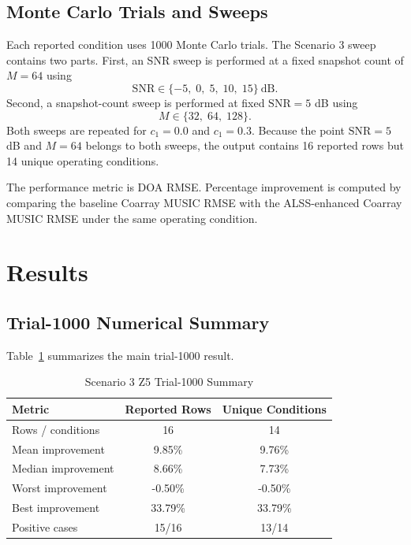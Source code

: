 \documentclass[conference]{IEEEtran}
\begin{document}
\subsection{Monte Carlo Trials and Sweeps}

Each reported condition uses 1000 Monte Carlo trials. The Scenario 3 sweep contains two parts. First, an SNR sweep is performed at a fixed snapshot count of $M=64$ using
\begin{equation}
    \mathrm{SNR} \in \{-5,\;0,\;5,\;10,\;15\}\ \mathrm{dB}.
\end{equation}
Second, a snapshot-count sweep is performed at fixed $\mathrm{SNR}=5$ dB using
\begin{equation}
    M \in \{32,\;64,\;128\}.
\end{equation}
Both sweeps are repeated for $c_1=0.0$ and $c_1=0.3$. Because the point $\mathrm{SNR}=5$ dB and $M=64$ belongs to both sweeps, the output contains 16 reported rows but 14 unique operating conditions.

The performance metric is DOA RMSE. Percentage improvement is computed by comparing the baseline Coarray MUSIC RMSE with the ALSS-enhanced Coarray MUSIC RMSE under the same operating condition.

\section{Results}

\subsection{Trial-1000 Numerical Summary}

Table~\ref{tab:trial1000_summary} summarizes the main trial-1000 result.

\begin{table}[!t]
\centering
\caption{Scenario 3 Z5 Trial-1000 Summary}
\label{tab:trial1000_summary}
\begin{tabular}{lcc}
\toprule
Metric & Reported Rows & Unique Conditions \\
\midrule
Rows / conditions & 16 & 14 \\
Mean improvement & 9.85\% & 9.76\% \\
Median improvement & 8.66\% & 7.73\% \\
Worst improvement & -0.50\% & -0.50\% \\
Best improvement & 33.79\% & 33.79\% \\
Positive cases & 15/16 & 13/14 \\
\bottomrule
\end{tabular}
\end{table}
\end{document}
